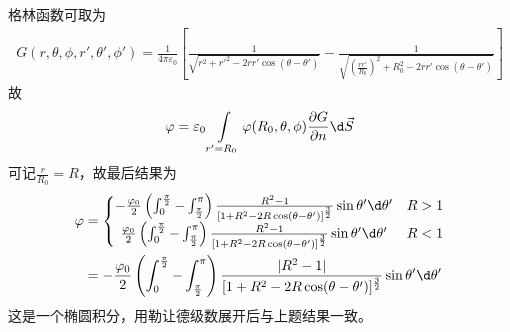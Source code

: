 \documentclass{phyasgn}
\begin{document}
\begin{sol}[8]
  格林函数可取为
  \begin{align*}
    G(r,\theta,\phi,r',\theta',\phi')=\frac{1}{4\pi\varepsilon_0}\left[\frac{1}{\sqrt{r^2+r'^2-2rr'\cos(\theta-\theta')}}-\frac{1}{\sqrt{(\frac{rr'}{R_0})^2+R_0^2-2rr'\cos(\theta-\theta')}}\right]
  \end{align*}
  故
  \begin{align*}
    \varphi=\varepsilon_0\int\limits_{r'=R_0}\varphi(R_0,\theta,\phi)\frac{\partial G}{\partial n}\d\vec{S}
  \end{align*}
  可记$\frac{r}{R_0}=R$，故最后结果为
  \begin{align*}
    \varphi&=\left\{\begin{matrix}
      -\frac{\varphi_0}{2}\left(\int_{0}^{\frac{\pi}{2}}-\int_{\frac{\pi}{2}}^{\pi}\right)\frac{R^2-1}{[1+R^2-2R\cos(\theta-\theta')]^\frac{3}{2}}\sin\theta'\d\theta'&R>1\\
      \frac{\varphi_0}{2}\left(\int_{0}^{\frac{\pi}{2}}-\int_{\frac{\pi}{2}}^{\pi}\right)\frac{R^2-1}{[1+R^2-2R\cos(\theta-\theta')]^\frac{3}{2}}\sin\theta'\d\theta'&R<1
    \end{matrix}\right.\\
    &=-\frac{\varphi_0}{2}\left(\int_{0}^{\frac{\pi}{2}}-\int_{\frac{\pi}{2}}^{\pi}\right)\frac{|R^2-1|}{[1+R^2-2R\cos(\theta-\theta')]^\frac{3}{2}}\sin\theta'\d\theta'
  \end{align*}
  这是一个椭圆积分，用勒让德级数展开后与上题结果一致。
\end{sol}
\end{document}
